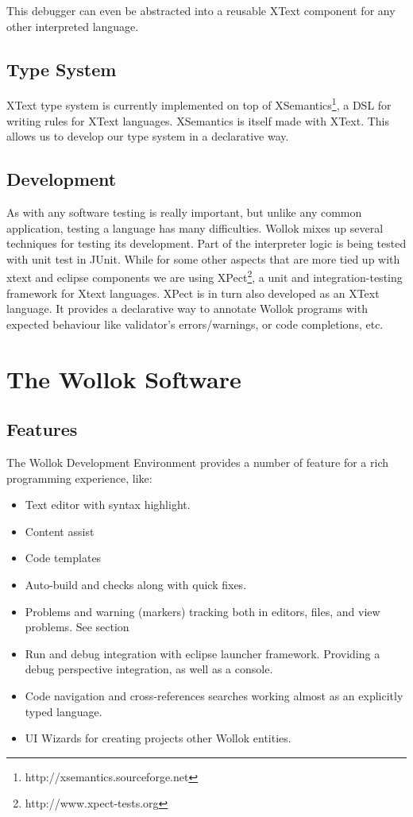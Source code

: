 This debugger can even be abstracted into a reusable XText component for any other interpreted language.

\subsection{Type System}

XText type system is currently implemented on top of XSemantics\footnote{http://xsemantics.sourceforge.net}, a DSL for writing rules for XText languages. XSemantics is itself made with XText.
This allows us to develop our type system in a declarative way.

\subsection{Development}

As with any software testing is really important, but unlike any common application, testing a language has many difficulties.
Wollok mixes up several techniques for testing its development.
Part of the interpreter logic is being tested with unit test in JUnit. While for some other aspects that are more tied up with xtext and eclipse components we are using XPect\footnote{http://www.xpect-tests.org}, a unit and integration-testing framework for Xtext languages.
XPect is in turn also developed as an XText language.
It provides a declarative way to annotate Wollok programs with expected
behaviour like validator’s errors/warnings, or code completions,  etc.

\section{The Wollok Software}

\subsection{Features}

The Wollok Development Environment provides a number of feature for a rich programming experience, like:

\begin{itemize}
 \item Text editor with syntax highlight.
 \item Content assist
 \item Code templates
 \item Auto-build and checks along with quick fixes.
 \item Problems and warning (markers) tracking both in editors, files, and view problems. See section 
 \item Run and debug integration with eclipse launcher framework. Providing a debug perspective integration, as well as a console.
 \item Code navigation and cross-references searches working almost as an explicitly typed language.
 \item UI Wizards for creating projects other Wollok entities.
\end{itemize}


